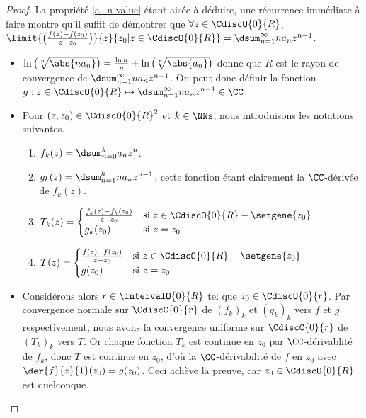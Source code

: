 \begin{proof}
	La propriété \ref{a_n-value} étant aisée à déduire, une récurrence immédiate à faire montre qu'il suffit de démontrer que
	$\forall z \in \CdiscO{0}{R}$,
	$ \limit{\big( \frac{f(z) - f(z_0)}{z - z_0} \big)}%
	        {z}{z_0 | z \in \CdiscO{0}{R}}
	= \dsum_{n = 1}^{\infty} n a_n z^{n - 1}$.
	\begin{itemize}
		\item
		$ \ln \big( \sqrt[n]{\abs{n a_n}} \big)
		= \frac{\ln n}{n} + \ln \big( \sqrt[n]{\abs{a_n}} \big)$
		donne que
		$R$ est le rayon de convergence de
		$\dsum_{n = 1}^{\infty} n a_n z^{n - 1}$.
		On peut donc définir la fonction $g: z \in \CdiscO{0}{R} \mapsto \dsum_{n = 1}^{\infty} n a_n z^{n - 1} \in \CC$.


		\item Pour $(z , z_0) \in \CdiscO{0}{R}^2$ et $k \in \NNs$, nous introduisons les notations suivantes.
        \begin{enumerate}[label=(\alph*)]
	        \item $f_k(z) = \dsum_{n = 0}^{k} a_n z^n$.

	        \item $g_k(z) = \dsum_{n = 1}^{k} n a_n z^{n-1}$,
	        cette fonction étant clairement la $\CC$-dérivée de $f_k(z)$.

	        \item $T_k(z) =
			\begin{cases}
	    		  \frac{f_k(z) - f_k(z_0)}{z - z_0}
				& \text{si $z \in \CdiscO{0}{R} - \setgene{z_0}$}
				\\
	   			  g_k(z_0) 
				& \text{si $z = z_0$}
	 		\end{cases}$

	        \item $T(z) =
			\begin{cases}
	    		  \frac{f(z) - f(z_0)}{z - z_0} 
				& \text{si $z \in \CdiscO{0}{R} - \setgene{z_0}$}
				\\
	   			  g(z_0)
				& \text{si $z = z_0$}
	 		\end{cases}$
	    \end{enumerate}


		\item Considérons alors $r \in \intervalO{0}{R}$ tel que $z_0 \in \CdiscO{0}{r}$.
		Par convergence normale sur $\CdiscC{0}{r}$ de $(f_k)_k$ et $(g_k)_k$ vers $f$ et $g$ respectivement,
		nous avons la convergence uniforme sur $\CdiscC{0}{r}$ de $(T_k)_k$ vers $T$. 
		Or chaque fonction $T_k$ est continue en $z_0$ par $\CC$-dérivablité de $f_k$, donc $T$ est continue en $z_0$,
		d'où
		la $\CC$-dérivabilité de  $f$ en $z_0$ avec $\der{f}{z}{1}(z_0) = g(z_0)$.
		Ceci achève la preuve, car $z_0 \in \CdiscO{0}{R}$ est quelconque.
	\end{itemize}
\end{proof}


